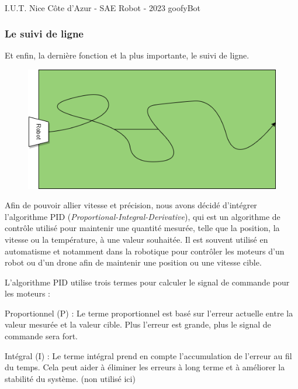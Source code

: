 \vfill
\noindent\makebox[\linewidth]{\rule{.8\paperwidth}{.6pt}}\\[0.2cm]
I.U.T. Nice Côte d'Azur - SAE Robot - 2023 \hfill goofyBot
\noindent\makebox[\linewidth]{\rule{.8\paperwidth}{.6pt}}
\newpage

\subsubsection{Le suivi de ligne}

Et enfin, la dernière fonction et la plus importante, le suivi de ligne.

\begin{figure}[H]
\centering
\begin{minipage}{.5\textwidth}
  \centering
  \centerline{\includegraphics[width=1\linewidth]{img/parcours/suivideligne.png}}
  \label{fig:suiviligne}
\end{minipage}%
\end{figure}

Afin de pouvoir allier vitesse et précision, nous avons décidé d'intégrer l'algorithme PID (\emph{Proportional-Integral-Derivative}), qui est un algorithme de contrôle utilisé pour maintenir une quantité mesurée, telle que la position, la vitesse ou la température, à une valeur souhaitée. Il est souvent utilisé  en automatisme et notamment dans la robotique pour contrôler les moteurs d'un robot ou d'un drone afin de maintenir une position ou une vitesse cible.   

L'algorithme PID utilise trois termes pour calculer le signal de commande pour les moteurs :

Proportionnel (P) : Le terme proportionnel est basé sur l'erreur actuelle entre la valeur mesurée et la valeur cible. Plus l'erreur est grande, plus le signal de commande sera fort.

Intégral (I) : Le terme intégral prend en compte l'accumulation de l'erreur au fil du temps. Cela peut aider à éliminer les erreurs à long terme et à améliorer la stabilité du système. (non utilisé ici)

